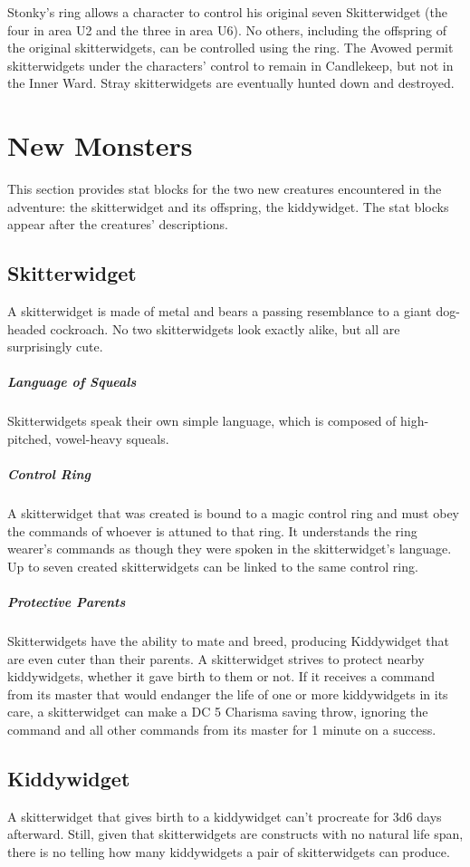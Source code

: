 \documentclass[10pt,a4paper,twoside,bg=print,twocolumn,openany,nodeprecatedcode]{dndbook}
\begin{document}
Stonky's ring allows a character to control his original seven Skitterwidget (the four in area U2 and the three in area U6). No others, including the offspring of the original skitterwidgets, can be controlled using the ring. The Avowed permit skitterwidgets under the characters' control to remain in Candlekeep, but not in the Inner Ward. Stray skitterwidgets are eventually hunted down and destroyed.

\section{New Monsters}
This section provides stat blocks for the two new creatures encountered in the adventure: the skitterwidget and its offspring, the kiddywidget. The stat blocks appear after the creatures' descriptions.

\subsection{Skitterwidget}
A skitterwidget is made of metal and bears a passing resemblance to a giant dog-headed cockroach. No two skitterwidgets look exactly alike, but all are surprisingly cute.

\subparagraph{Language of Squeals}
Skitterwidgets speak their own simple language, which is composed of high-pitched, vowel-heavy squeals.

\subparagraph{Control Ring}
A skitterwidget that was created is bound to a magic control ring and must obey the commands of whoever is attuned to that ring. It understands the ring wearer's commands as though they were spoken in the skitterwidget's language. Up to seven created skitterwidgets can be linked to the same control ring.

\subparagraph{Protective Parents}
Skitterwidgets have the ability to mate and breed, producing Kiddywidget that are even cuter than their parents. A skitterwidget strives to protect nearby kiddywidgets, whether it gave birth to them or not. If it receives a command from its master that would endanger the life of one or more kiddywidgets in its care, a skitterwidget can make a DC 5 Charisma saving throw, ignoring the command and all other commands from its master for 1 minute on a success.

\subsection{Kiddywidget}
A skitterwidget that gives birth to a kiddywidget can't procreate for 3d6 days afterward. Still, given that skitterwidgets are constructs with no natural life span, there is no telling how many kiddywidgets a pair of skitterwidgets can produce.
\end{document}

